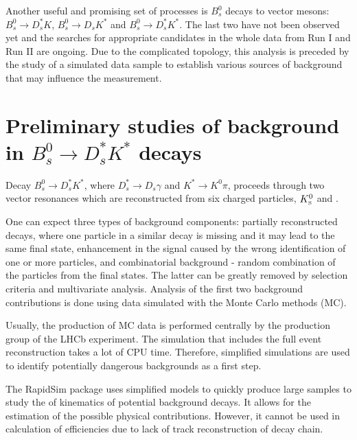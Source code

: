 \documentclass{appolb}
\begin{document}
Another useful and promising set of processes is $B^0_s$ decays to vector mesons: $B^0_s \rightarrow D_s^* K$,  $B^0_s \rightarrow D_s K^*$ and $B^0_s \rightarrow D_s^* K^*$. The last two have not been observed yet and the searches for appropriate candidates in the whole data from Run I and Run II are ongoing. Due to the complicated topology, this analysis is preceded by the study of a simulated data sample to establish various sources of background that may influence the measurement.


\section{Preliminary studies of background in $B^0_s \rightarrow D_s^* K^*$ decays}

Decay $B^0_s \rightarrow D_s^* K^*$, where $D^*_s\rightarrow D_s \gamma$ and $K^*\rightarrow K^0 \pi$, proceeds through two vector resonances which are reconstructed from six charged particles, ${{K}^0_{\mathrm{ \scriptscriptstyle S}}}$ and \g. 

 One can expect three types of background components: partially reconstructed decays, where one particle in a similar decay is missing and it may lead to the same final state, enhancement in the signal caused by the wrong identification of one or more particles, and combinatorial background - random combination of the particles from the final states. 
 The latter can be greatly removed by selection criteria and multivariate analysis. Analysis of the first two background contributions is done using data simulated with the Monte Carlo methods (MC).

Usually, the production of MC data is performed centrally by the production group of the LHCb experiment. The simulation that includes the full event reconstruction takes a lot of CPU time. Therefore, simplified simulations are used to identify potentially dangerous backgrounds as a first step.

The RapidSim package \cite{rapidsim} uses simplified models to quickly produce large samples to study the of kinematics of potential background decays. It allows for the estimation of the possible physical contributions. However, it cannot be used in calculation of efficiencies due to lack of track reconstruction of decay chain. 
\end{document}
